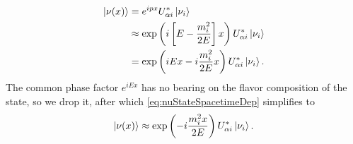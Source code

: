 \documentclass[../thesis.tex]{subfiles}
\begin{document}
\begin{equation}
  \begin{aligned}
    \label{eq:nuStateSpacetimeDep}
    \ket{\nu(x)} &= e^{ipx} U^*_{\alpha i}\ket{\nu_i} \\
    &\approx \exp \left( i\left[E - \frac{m_i^2}{2E} \right] x \right) U^*_{\alpha i}\ket{\nu_i} \\
    &= \exp \left( iEx - i\frac{m_i^2}{2E}x \right) U^*_{\alpha i}\ket{\nu_i}.
  \end{aligned}
\end{equation}
The common phase factor $e^{iEx}$ has no bearing on the flavor composition of the state, so we drop it, after which \autoref{eq:nuStateSpacetimeDep} simplifies to
\begin{equation}
  \ket{\nu(x)} \approx \exp \left( - i \frac{m_i^2 x}{2E} \right) U^*_{\alpha i} \ket{\nu_i}.
\end{equation}

\end{document}
